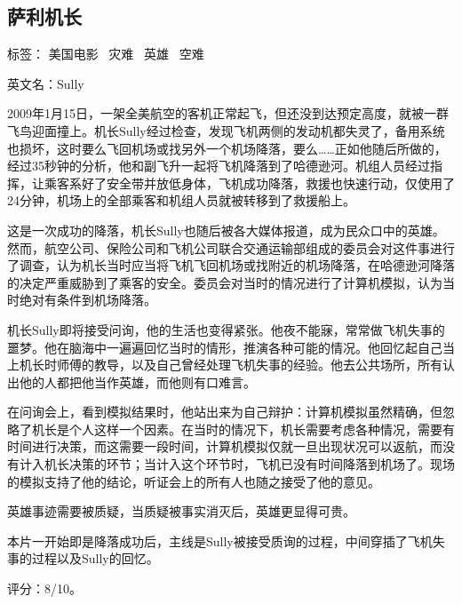 \subsection{萨利机长}

标签： 美国电影 \  灾难 \  英雄 \  空难

英文名：Sully

2009年1月15日，一架全美航空的客机正常起飞，但还没到达预定高度，就被一群飞鸟迎面撞上。机长Sully经过检查，发现飞机两侧的发动机都失灵了，备用系统也损坏，这时要么飞回机场或找另外一个机场降落，要么……正如他随后所做的，经过35秒钟的分析，他和副飞升一起将飞机降落到了哈德逊河。机组人员经过指挥，让乘客系好了安全带并放低身体，飞机成功降落，救援也快速行动，仅使用了24分钟，机场上的全部乘客和机组人员就被转移到了救援船上。

这是一次成功的降落，机长Sully也随后被各大媒体报道，成为民众口中的英雄。然而，航空公司、保险公司和飞机公司联合交通运输部组成的委员会对这件事进行了调查，认为机长当时应当将飞机飞回机场或找附近的机场降落，在哈德逊河降落的决定严重威胁到了乘客的安全。委员会对当时的情况进行了计算机模拟，认为当时绝对有条件到机场降落。

机长Sully即将接受问询，他的生活也变得紧张。他夜不能寐，常常做飞机失事的噩梦。他在脑海中一遍遍回忆当时的情形，推演各种可能的情况。他回忆起自己当上机长时师傅的教导，以及自己曾经处理飞机失事的经验。他去公共场所，所有认出他的人都把他当作英雄，而他则有口难言。

在问询会上，看到模拟结果时，他站出来为自己辩护：计算机模拟虽然精确，但忽略了机长是个人这样一个因素。在当时的情况下，机长需要考虑各种情况，需要有时间进行决策，而这需要一段时间，计算机模拟仅就一旦出现状况可以返航，而没有计入机长决策的环节；当计入这个环节时，飞机已没有时间降落到机场了。现场的模拟支持了他的结论，听证会上的所有人也随之接受了他的意见。

英雄事迹需要被质疑，当质疑被事实消灭后，英雄更显得可贵。

本片一开始即是降落成功后，主线是Sully被接受质询的过程，中间穿插了飞机失事的过程以及Sully的回忆。

评分：8/10。
